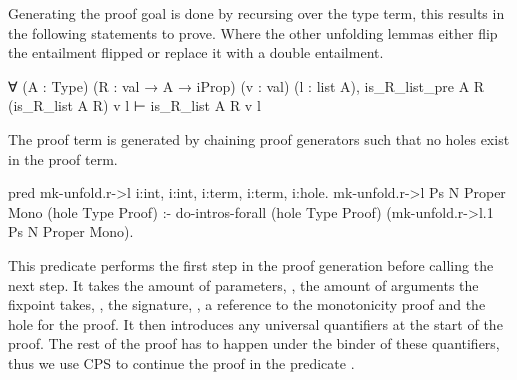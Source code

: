 \documentclass[thesis.tex]{subfiles}
\begin{document}
Generating the proof goal is done by recursing over the type term, this results in the following statements to prove. Where the other unfolding lemmas either flip the entailment flipped or replace it with a double entailment.
\begin{coqcode}
  ∀ (A : Type) (R : val → A → iProp) 
    (v : val) (l : list A),
      is_R_list_pre A R (is_R_list A R) v l 
    ⊢ is_R_list A R v l
\end{coqcode}

The proof term is generated by chaining proof generators such that no holes exist in the proof term.
\begin{elpicode}
  pred mk-unfold.r->l i:int, i:int, 
                      i:term, i:term, i:hole.
  mk-unfold.r->l Ps N Proper Mono (hole Type Proof) :-
    do-intros-forall (hole Type Proof) 
                     (mk-unfold.r->l.1 Ps N Proper Mono).
\end{elpicode}
This predicate performs the first step in the proof generation before calling the next step. It takes the amount of parameters, , the amount of arguments the fixpoint takes, , the  signature, , a reference to the monotonicity proof  and the hole for the proof. It then introduces any universal quantifiers at the start of the proof. The rest of the proof has to happen under the binder of these quantifiers, thus we use CPS to continue the proof in the predicate .
\end{document}
